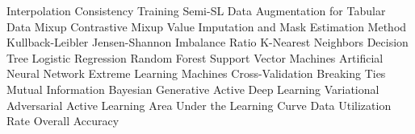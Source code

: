 {{\begin{acronym}
              {Interpolation Consistency Training}
             {Semi-SL Data Augmentation for Tabular Data}
             {Mixup Contrastive Mixup}
             {Value Imputation and Mask Estimation Method}
               {Kullback-Leibler}
               {Jensen-Shannon}
               {Imbalance Ratio}
              {K-Nearest Neighbors}
               {Decision Tree}
               {Logistic Regression}
               {Random Forest}
              {Support Vector Machines}
              {Artificial Neural Network}
              {Extreme Learning Machines}
               {Cross-Validation}
               {Breaking Ties}
               {Mutual Information}
            {Bayesian Generative Active Deep Learning}
             {Variational Adversarial Active Learning}
             {Area Under the Learning Curve}
              {Data Utilization Rate}
               {Overall Accuracy}
\end{acronym}
}
\pagebreak
}

